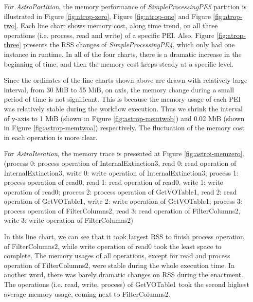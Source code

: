 \documentclass[10pt,twoside,openright,logo]{report}
\begin{document}
For \textit{AstroPartition}, the memory performance of \textit{SimpleProcessingPE5} partition is illustrated in Figure \ref{fig:atrop-zero}, Figure \ref{fig:atrop-one} and Figure \ref{fig:atrop-two}. Each line chart shows memory cost, along time trend, on all three operations (i.e. process, read and write) of a specific PEI. Also, Figure \ref{fig:atrop-three} presents the RSS changes of \textit{SimpleProcessingPE4}, which only had one instance in runtime. In all of the four charts, there is a dramatic increase in the beginning of time, and then the memory cost keeps steady at a specific level.
\figaspzero
%
\figaspone

\figasptwo

\figaspthree

Since the ordinates of the line charts shown above are drawn with relatively large interval, from 30 MiB to 55 MiB, on axis, the memory change during a small period of time is not significant. This is because the memory usage of each PEI was relatively stable during the workflow execution.
Thus we shrink the interval of y-axis to 1 MiB (shown in Figure \ref{fig:astrop-memtwob}) and 0.02 MiB (shown in Figure \ref{fig:astrop-memtwoa}) respectively. The fluctuation of the memory cost in each operation is more clear.

\figmemtwob

\figmemtwoa

\figastroim
For \textit{AstroIteration}, the memory trace is presented at Figure \ref{fig:astroi-memzero}.
(process 0: process operation of InternalExtinction3, read 0: read operation of InternalExtinction3, write 0: write operation of InternalExtinction3;
process 1: process operation of read0, read 1: read operation of read0, write 1: write operation of read0;
process 2: process operation of GetVOTable1, read 2: read operation of GetVOTable1, write 2: write operation of GetVOTable1;
process 3: process operation of FilterColumns2, read 3: read operation of FilterColumns2, write 3: write operation of FilterColumns2)

In this line chart, we can see that it took largest RSS to finish process operation of FilterColumns2, while write operation of read0 took the least space to complete. The memory usages of all operations, except for read and process operation of FilterColumns2, were stable during the whole execution time. In another word, there was barely dramatic changes on RSS during the enactment. The operations (i.e. read, write, process) of GetVOTable1 took the second highest average memory usage, coming next to FilterColumns2.
\end{document}
